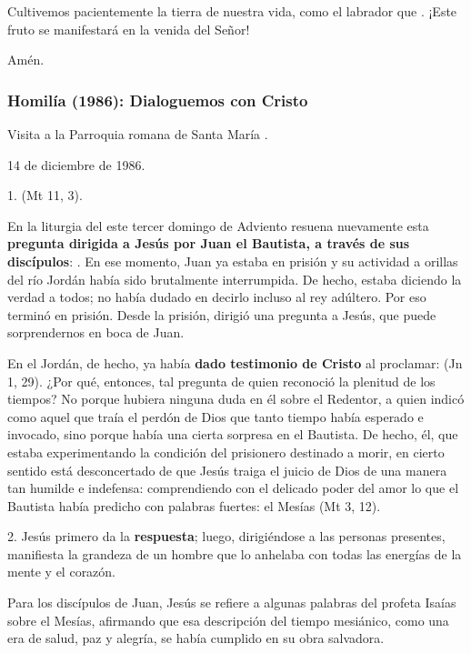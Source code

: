 \begin{body}
\begin{body}
Cultivemos pacientemente la tierra de nuestra vida, como el labrador que . ¡Este fruto se manifestará en la venida del Señor!

Amén.

\subsubsection{Homilía (1986): Dialoguemos con Cristo}

Visita a la Parroquia romana de Santa María .

14 de diciembre de 1986.

1.  (Mt 11, 3).

En la liturgia del este tercer domingo de Adviento resuena nuevamente esta \textbf{pregunta dirigida a Jesús por Juan el Bautista, a través de sus discípulos}: . En ese momento, Juan ya estaba en prisión y su actividad a orillas del río Jordán había sido brutalmente interrumpida. De hecho, estaba diciendo la verdad a todos; no había dudado en decirlo incluso al rey adúltero. Por eso terminó en prisión. Desde la prisión, dirigió una pregunta a Jesús, que puede sorprendernos en boca de Juan.

En el Jordán, de hecho, ya había \textbf{dado testimonio de Cristo} al proclamar:  (Jn 1, 29). ¿Por qué, entonces, tal pregunta de quien reconoció la plenitud de los tiempos? No porque hubiera ninguna duda en él sobre el Redentor, a quien indicó como aquel que traía el perdón de Dios que tanto tiempo había esperado e invocado, sino porque había una cierta sorpresa en el Bautista. De hecho, él, que estaba experimentando la condición del prisionero destinado a morir, en cierto sentido está desconcertado de que Jesús traiga el juicio de Dios de una manera tan humilde e indefensa: comprendiendo con el delicado poder del amor lo que el Bautista había predicho con palabras fuertes: el Mesías  (Mt 3, 12).

2. Jesús primero da la \textbf{respuesta}; luego, dirigiéndose a las personas presentes, manifiesta la grandeza de un hombre que lo anhelaba con todas las energías de la mente y el corazón.

Para los discípulos de Juan, Jesús se refiere a algunas palabras del profeta Isaías sobre el Mesías, afirmando que esa descripción del tiempo mesiánico, como una era de salud, paz y alegría, se había cumplido en su obra salvadora.


\end{body}
\end{body}
